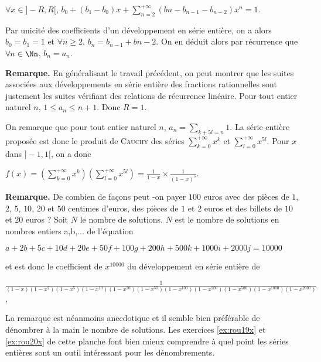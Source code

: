 {{\begin{center}
$\forall x\in]-R,R[$, $b_0 +(b_1-b_0)x+\sum_{n=2}^{+\infty}(bn-b_{n-1}-b_{n-2})x^n = 1$.
\end{center}

Par unicité des coefficients d'un développement en série entière, on a alors $b_0=b_1= 1$ et $\forall n\geqslant2$, $b_n = b_{n-1}+b{n-2}$. On en déduit alors par récurrence que $\forall n\in\Nn$, $b_n = a_n$.

\begin{center}
\shadowbox{
$\forall x\in\left]-\frac{\sqrt{5}-1}{2},\frac{\sqrt{5}-1}{2}\right[$, $\sum_{n=0}^{+\infty}a_nx^n=\frac{1}{1-x-x^2}$.
}
\end{center}

\textbf{Remarque.} En généralisant le travail précédent, on peut montrer que les suites associées aux développements en série entière des fractions rationnelles sont justement les suites vérifiant des relations de récurrence linéaire.
Pour tout entier naturel $n$, $1\leqslant a_n\leqslant n+1$. Donc $R = 1$.

On remarque que pour tout entier naturel $n$, $a_n =\sum_{k+5l=n}^{}1$. La série entière proposée est donc le produit de \textsc{Cauchy} des séries $\sum_{k=0}^{+\infty}x^k$ et $\sum_{l=0}^{+\infty}x^{5l}$. Pour $x$ dans $]-1,1[$, on a donc

\begin{center}
$f(x) =\left(\sum_{k=0}^{+\infty}x^k\right)\left(\sum_{l=0}^{+\infty}x^{5l}\right)=\frac{1}{1-x}\times\frac{1}{(1-x)^5}$.
\end{center}

\textbf{Remarque.} De combien de façons peut -on payer $100$ euros avec des pièces de $1$, $2$, $5$, $10$, $20$ et $50$ centimes d'euros, des pièces de $1$ et $2$ euros et des billets de $10$ et $20$ euros ? Soit $N$ le nombre de solutions. $N$ est le nombre de solutions en nombres entiers a,b,... de l'équation

\begin{center}
$a +2b +5c +10d +20e +50f +100g +200h+500k+1000i+2000j=10000$
\end{center}

et est donc le coefficient de $x^{10000}$ du développement en série entière de 

\begin{center}
$\frac{1}{(1-x)(1-x^2)(1-x^5)(1-x^{10})(1-x^{20})(1-x^{50})(1-x^{100})(1-x^{200})(1-x^{500})(1-x^{1000})(1-x^{2000})}$,
\end{center}

La remarque est néanmoins anecdotique et il semble bien préférable de dénombrer à la main le nombre de solutions. Les 
exercices \ref{ex:rou19x} et \ref{ex:rou20x} de cette planche font bien mieux comprendre à quel point les séries entières sont un outil intéressant pour les dénombrements.
}
}
